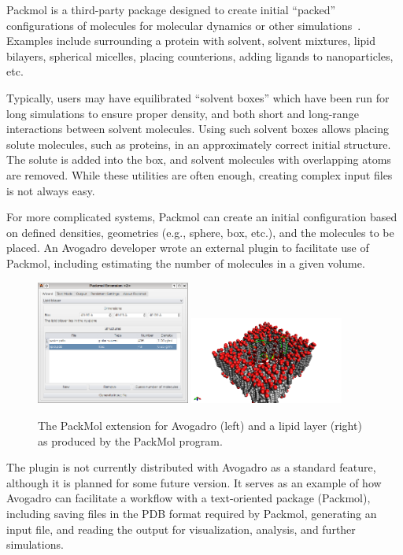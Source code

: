 \documentclass[10pt]{bmc_article}
\newenvironment{bmcformat}{\begin{raggedright}
\baselineskip20pt\sloppy\setboolean{publ}{false}}{\end{raggedright}
\baselineskip20pt\sloppy}
\begin{document}
\begin{bmcformat}
Packmol is a third-party package designed to create initial
``packed'' configurations of molecules for molecular dynamics or other
simulations~\cite{packmol,packmol-packing}. Examples include
surrounding a protein with solvent, solvent mixtures, lipid bilayers,
spherical micelles, placing counterions, adding ligands to
nanoparticles, etc.

Typically, users may have equilibrated ``solvent boxes'' which have
been run for long simulations to ensure proper density, and both short
and long-range interactions between solvent molecules. Using such
solvent boxes allows placing solute molecules, such as proteins, in an
approximately correct initial structure. The solute is added into the
box, and solvent molecules with overlapping atoms are removed. While
these utilities are often enough, creating complex input files is not
always easy.

For more complicated systems, Packmol can create an initial
configuration based on defined densities, geometries (e.g., sphere,
box, etc.), and the molecules to be placed. An Avogadro developer wrote
an external plugin to facilitate use of Packmol, including estimating
the number of molecules in a given volume.

\begin{figure}
  \includegraphics[width=0.45\textwidth]{images/packmol-extension}
  \includegraphics[width=0.45\textwidth]{images/packmol-lipid}
  \caption{The PackMol extension for Avogadro (left) and a lipid layer (right)
    as produced by the PackMol program.}
  \label{f:packmol}
\end{figure}

The plugin is not currently distributed with Avogadro as a standard
feature, although it is planned for some future version. It serves as
an example of how Avogadro can facilitate a workflow with a
text-oriented package (Packmol), including saving files in the PDB
format required by Packmol, generating an input file, and reading the
output for visualization, analysis, and further simulations.


\end{bmcformat}
\end{document}
